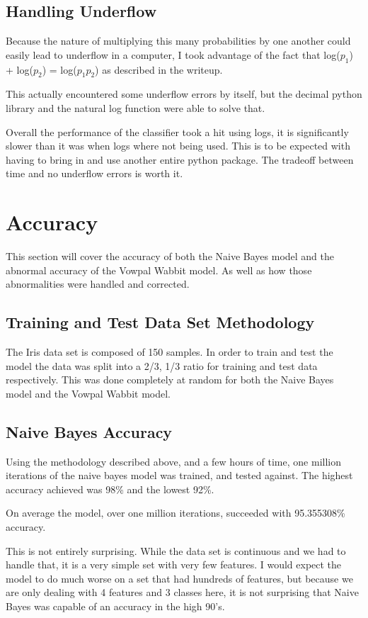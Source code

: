 \documentclass{article}
\begin{document}
\subsection{Handling Underflow}
Because the nature of multiplying this many probabilities by one another could easily lead to underflow in a computer, I took advantage of the fact that log($p_1$) + log($p_2$) = log($p_1 p_2$) as described in the writeup. 

This actually encountered some underflow errors by itself, but the decimal python library and the natural log function were able to solve that. 

Overall the performance of the classifier took a hit using logs, it is significantly slower than it was when logs where not being used. This is to be expected with having to bring in and use another entire python package. The tradeoff between time and no underflow errors is worth it. 

\section{Accuracy}
This section will cover the accuracy of both the Naive Bayes model and the abnormal accuracy of the Vowpal Wabbit model. As well as how those abnormalities were handled and corrected.  

\subsection{Training and Test Data Set Methodology}
The Iris data set is composed of 150 samples. In order to train and test the model the data was split into a 2/3, 1/3 ratio for training and test data respectively. This was done completely at random for both the Naive Bayes model and the Vowpal Wabbit model. 

\subsection{Naive Bayes Accuracy}
Using the methodology described above, and a few hours of time, one million iterations of the naive bayes model was trained, and tested against. The highest accuracy achieved was 98\% and the lowest 92\%. 

On average the model, over one million iterations, succeeded with 95.355308\% accuracy. 

This is not entirely surprising. While the data set is continuous and we had to handle that, it is a very simple set with very few features. I would expect the model to do much worse on a set that had hundreds of features, but because we are only dealing with 4 features and 3 classes here, it is not surprising that Naive Bayes was capable of an accuracy in the high 90's. 
\end{document}
